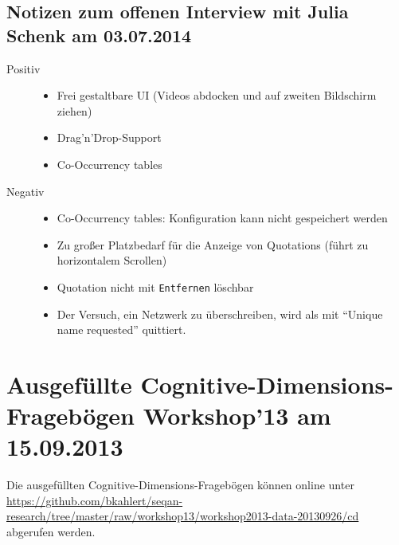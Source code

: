 \subsection[Julia Schenk, 03.07.2014]{Notizen zum offenen Interview mit Julia Schenk am 03.07.2014}

\begin{description}
	\item[Positiv] \hfill
\begin{itemize}
\itemsep1pt\parskip0pt
\item Frei gestaltbare UI (Videos abdocken und auf zweiten Bildschirm ziehen)
\item Drag'n'Drop-Support
\item Co-Occurrency tables
\end{itemize}

	\item[Negativ] \hfill
\begin{itemize}
\itemsep1pt\parskip0pt
\item Co-Occurrency tables: Konfiguration kann nicht gespeichert werden
\item Zu großer Platzbedarf für die Anzeige von Quotations (führt zu horizontalem Scrollen)
\item Quotation nicht mit \texttt{Entfernen} löschbar
\item Der Versuch, ein Netzwerk zu überschreiben, wird als mit ``Unique name requested'' quittiert.
\end{itemize}
\end{description}






\section[Ausgefüllte Cognitive-Dimensions-Fragebögen, 15.09.2013]{Ausgefüllte Cognitive-Dimensions-Fragebögen Workshop'13 am 15.09.2013}

Die ausgefüllten Cognitive-Dimensions-Fragebögen können online unter \url{https://github.com/bkahlert/seqan-research/tree/master/raw/workshop13/workshop2013-data-20130926/cd} abgerufen werden.




